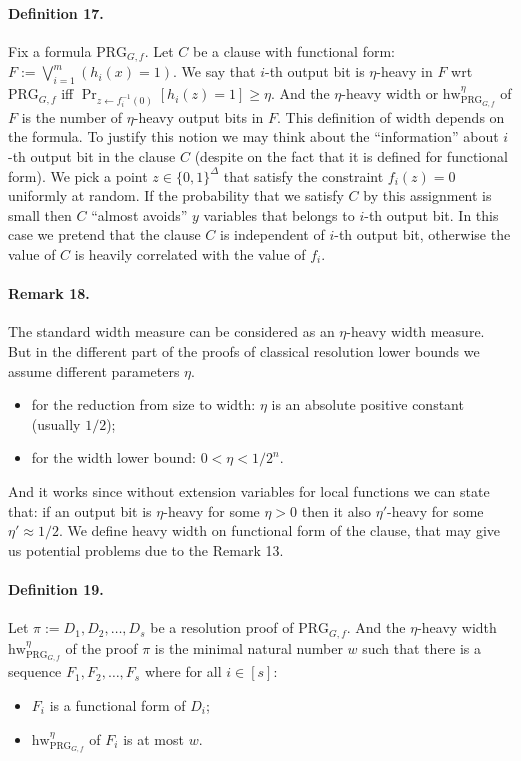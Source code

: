 \documentclass[10pt,a4paper]{article}
\begin{document}
\paragraph{Definition 17.} Fix a formula $\mathrm{PRG}_{G,f}$. Let $C$ be a clause with functional form: $F:=\bigvee_{i=1}^m(h_i(x)=1)$. We say that $i$-th output bit is $\eta$-heavy in $F$ wrt $\mathrm{PRG}_{G,f}$ iff $\Pr_{z\leftarrow f_i^{-1}(0)}[h_i(z)=1]\geq\eta$. And the $\eta$-heavy width or $\mathrm{hw}_{\mathrm{PRG}_{G,f}}^\eta$ of $F$ is the number of $\eta$-heavy output bits in $F$.
This definition of width depends on the formula.
To justify this notion we may think about the ``information'' about $i$-th output bit in the clause $C$ (despite on the fact that it is defined for functional form). We pick a point $z\in\{0,1\}^\Delta$ that satisfy the constraint $f_i(z)=0$ uniformly at random. If the probability that we satisfy $C$ by this assignment is small then $C$ ``almost avoids'' $y$ variables that belongs to $i$-th output bit. In this case we pretend that the clause $C$ is independent of $i$-th output bit, otherwise the value of $C$ is heavily correlated with the value of $f_i$.
\paragraph{Remark 18.} The standard width measure can be considered as an $\eta$-heavy width measure. But in the different part of the proofs of classical resolution lower bounds we assume different parameters $\eta$.
\begin{itemize}
\item for the reduction from size to width: $\eta$ is an absolute positive constant (usually $1/2$);
\item for the width lower bound: $0<\eta<1/2^n$.
\end{itemize}
And it works since without extension variables for local functions we can state that: if an output bit is $\eta$-heavy for some $\eta>0$ then it also $\eta'$-heavy for some $\eta'\approx1/2$.
We define heavy width on functional form of the clause, that may give us potential problems due to the Remark 13.
\paragraph{Definition 19.} Let $\pi:=D_1,D_2,\ldots,D_s$ be a resolution proof of $\mathrm{PRG}_{G,f}$. And the $\eta$-heavy width $\mathrm{hw}_{\mathrm{PRG}_{G,f}}^\eta$ of the proof $\pi$ is the minimal natural number $w$ such that there is a sequence $F_1,F_2,\ldots,F_s$ where for all $i\in[s]$:
\begin{itemize}
\item $F_i$ is a functional form of $D_i$;
\item $\mathrm{hw}_{\mathrm{PRG}_{G,f}}^\eta$ of $F_i$ is at most $w$.
\end{itemize}
\end{document}

